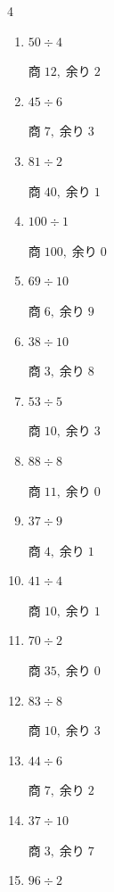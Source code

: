 \begin{multicols}{4}
\begin{enumerate}
        $商\; 3,\; 余り\; 9$

  \item $50 \div 4$

        $商\; 12,\; 余り\; 2$

  \item $45 \div 6$

        $商\; 7,\; 余り\; 3$

  \item $81 \div 2$

        $商\; 40,\; 余り\; 1$

  \item $100 \div 1$

        $商\; 100,\; 余り\; 0$

  \item $69 \div 10$

        $商\; 6,\; 余り\; 9$

  \item $38 \div 10$

        $商\; 3,\; 余り\; 8$

  \item $53 \div 5$

        $商\; 10,\; 余り\; 3$

  \item $88 \div 8$

        $商\; 11,\; 余り\; 0$

  \item $37 \div 9$

        $商\; 4,\; 余り\; 1$

  \item $41 \div 4$

        $商\; 10,\; 余り\; 1$

  \item $70 \div 2$

        $商\; 35,\; 余り\; 0$

  \item $83 \div 8$

        $商\; 10,\; 余り\; 3$

\columnbreak %

  \item $44 \div 6$

        $商\; 7,\; 余り\; 2$

  \item $37 \div 10$

        $商\; 3,\; 余り\; 7$

  \item $96 \div 2$


\end{enumerate}
\end{multicols}

